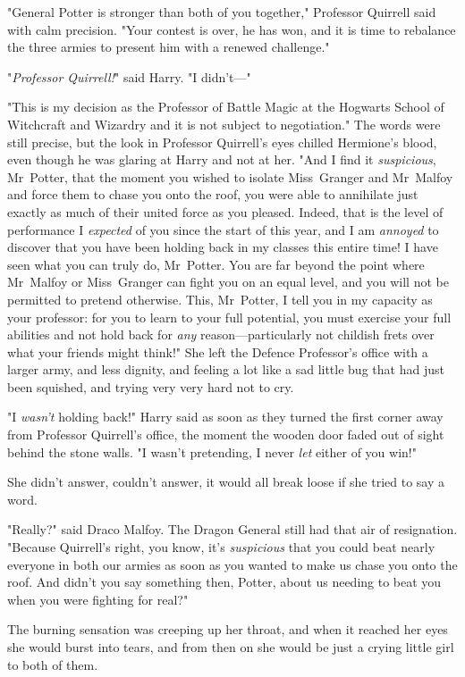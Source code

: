 "General Potter is stronger than both of you together," Professor Quirrell said
with calm precision. "Your contest is over, he has won, and it is time to
rebalance the three armies to present him with a renewed challenge."

"\emph{Professor Quirrell!}" said Harry. "I didn't---"

"This is my decision as the Professor of Battle Magic at the Hogwarts School of
Witchcraft and Wizardry and it is not subject to negotiation." The words were
still precise, but the look in Professor Quirrell's eyes chilled Hermione's
blood, even though he was glaring at Harry and not at her. "And I find it
\emph{suspicious}, Mr~Potter, that the moment you wished to isolate
Miss~Granger and Mr~Malfoy and force them to chase you onto the roof, you were able
to annihilate just exactly as much of their united force as you pleased.
Indeed, that is the level of performance I \emph{expected} of you since the
start of this year, and I am \emph{annoyed} to discover that you have been
holding back in my classes this entire time! I have seen what you can truly do,
Mr~Potter. You are far beyond the point where Mr~Malfoy or Miss~Granger can
fight you on an equal level, and you will not be permitted to pretend
otherwise. This, Mr~Potter, I tell you in my capacity as your professor: for
you to learn to your full potential, you must exercise your full abilities and
not hold back for \emph{any} reason---particularly not childish frets over what
your friends might think!"
\later
She left the Defence Professor's office with a larger army, and less dignity,
and feeling a lot like a sad little bug that had just been squished, and trying
very very hard not to cry.

"I \emph{wasn't} holding back!" Harry said as soon as they turned the first
corner away from Professor Quirrell's office, the moment the wooden door faded
out of sight behind the stone walls. "I wasn't pretending, I never \emph{let}
either of you win!"

She didn't answer, couldn't answer, it would all break loose if she tried to
say a word.

"Really?" said Draco Malfoy. The Dragon General still had that air of
resignation. "Because Quirrell's right, you know, it's \emph{suspicious} that
you could beat nearly everyone in both our armies as soon as you wanted to make
us chase you onto the roof. And didn't you say something then, Potter, about us
needing to beat you when you were fighting for real?"

The burning sensation was creeping up her throat, and when it reached her eyes
she would burst into tears, and from then on she would be just a crying little
girl to both of them.

